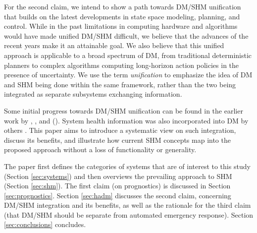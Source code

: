 For the second claim, we intend to show a path towards DM/SHM unification that builds on the latest developments in state space modeling, planning, and control. While in the past limitations in computing hardware and algorithms would have made unified DM/SHM difficult, we believe that the advances of the recent years make it an attainable goal. We also believe that this unified approach is applicable to a broad spectrum of DM, from traditional deterministic planners to complex algorithms computing long-horizon action policies in the presence of uncertainty. We use the term \emph{unification} to emphasize the idea of DM and SHM being done within the same framework, rather than the two being integrated as separate subsystems exchanging information.

Some initial progress towards DM/SHM unification can be found in the earlier work by \citet{Balaban2013a}, \citet{Balaban2018}, and \citeauthor{Johnson2010} (\citeyear{Johnson2010,Johnson2011a}). System health information was also incorporated into DM by others \cite{Bethke2008,Ure2013,Agha-mohammadi2014}. This paper aims to introduce a systematic view on such integration, discuss its benefits, and illustrate how current SHM concepts map into the proposed approach without a loss of functionality or generality.

The paper first defines the categories of systems that are of interest to this study (Section \ref{sec:systems}) and then overviews the prevailing approach to  SHM (Section \ref{sec:shm}). The first claim (on prognostics) is discussed in Section \ref{sec:prognostics}. Section \ref{sec:hadm} discusses the second claim, concerning DM/SHM integration and its benefits, as well as the rationale for the third claim (that DM/SHM should be separate from automated emergency response). Section \ref{sec:conclusions} concludes.
